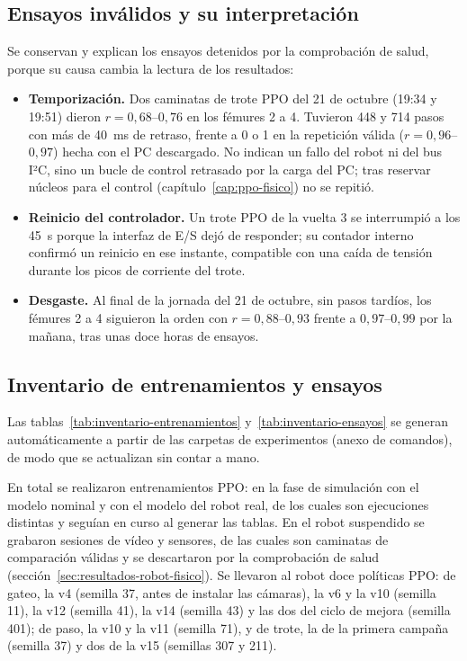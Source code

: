 \subsection{Ensayos inválidos y su interpretación}

Se conservan y explican los ensayos detenidos por la comprobación de salud,
porque su causa cambia la lectura de los resultados:
\begin{itemize}
    \item \textbf{Temporización.} Dos caminatas de trote PPO del 21 de octubre
    (19:34 y 19:51) dieron $r=0{,}68$--$0{,}76$ en los fémures 2 a 4. Tuvieron
    448 y 714 pasos con más de 40~ms de retraso, frente a 0 o 1 en la
    repetición válida ($r=0{,}96$--$0{,}97$) hecha con el PC descargado. No
    indican un fallo del robot ni del bus I²C, sino un bucle de control
    retrasado por la carga del PC; tras reservar núcleos para el control
    (capítulo~\ref{cap:ppo-fisico}) no se repitió.
    \item \textbf{Reinicio del controlador.} Un trote PPO de la vuelta 3 se
    interrumpió a los 45~s porque la interfaz de E/S dejó de responder; su contador
    interno confirmó un reinicio en ese instante, compatible con una caída de
    tensión durante los picos de corriente del trote.
    \item \textbf{Desgaste.} Al final de la jornada del 21 de octubre, sin pasos
    tardíos, los fémures 2 a 4 siguieron la orden con $r=0{,}88$--$0{,}93$
    frente a $0{,}97$--$0{,}99$ por la mañana, tras unas doce horas de
    ensayos.
\end{itemize}

\subsection{Inventario de entrenamientos y ensayos}
\label{sec:inventario}

Las tablas~\ref{tab:inventario-entrenamientos} y~\ref{tab:inventario-ensayos}
se generan automáticamente a partir de las carpetas de experimentos
(anexo de comandos), de modo que se actualizan sin contar a mano.



En total se realizaron \InvTotal{} entrenamientos PPO: \InvSimulacion{} en la
fase de simulación con el modelo nominal y \InvReal{} con el modelo del robot
real, de los cuales \InvRealDistintas{} son ejecuciones distintas y
\InvEnCurso{} seguían en curso al generar las tablas. En el robot suspendido se
grabaron \InvGrabaciones{} sesiones de vídeo y sensores, de las cuales
\InvCaminatasValidas{} son caminatas de comparación válidas y
\InvCaminatasFallo{} se descartaron por la comprobación de salud
(sección~\ref{sec:resultados-robot-fisico}). Se llevaron al robot doce
políticas PPO: de gateo, la v4 (semilla 37, antes de instalar las cámaras), la
v6 y la v10 (semilla 11), la v12 (semilla 41), la v14 (semilla 43) y las dos del
ciclo de mejora (semilla 401); de paso, la v10 y la v11 (semilla 71), y de trote,
la de la primera campaña (semilla 37) y dos de la v15 (semillas 307 y 211).

